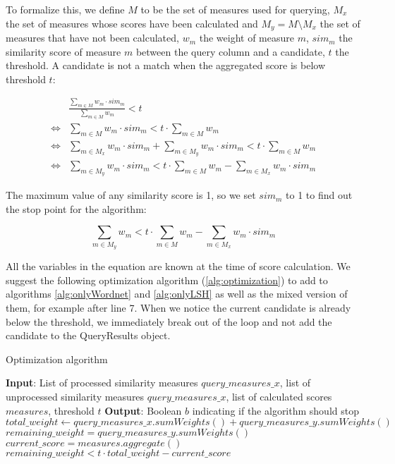 To formalize this, we define $M$ to be the set of measures used for querying, $M_x$ the set of measures whose scores have been calculated and $M_y = M \setminus M_x$ the set of measures that have not been calculated, $w_m$ the weight of measure $m$, $sim_m$ the similarity score of measure $m$ between the query column and a candidate, $t$ the threshold. A candidate is not a match when the aggregated score is below threshold $t$:

\begin{align*}
   & \frac{\sum_{m \in M} w_m \cdot sim_m}{\sum_{m \in M} w_m} < t \\
   \iff & \sum_{m \in M} w_m \cdot sim_m < t \cdot \sum_{m \in M} w_m \\
   \iff & \sum_{m \in M_x} w_m \cdot sim_m + \sum_{m \in M_y} w_m \cdot sim_m < t \cdot \sum_{m \in M} w_m \\
   \iff & \sum_{m \in M_y} w_m \cdot sim_m < t \cdot \sum_{m \in M} w_m - \sum_{m \in M_x} w_m \cdot sim_m
\end{align*}

The maximum value of any similarity score is 1, so we set $sim_m$ to 1 to find out the stop point for the algorithm:

\[\sum_{m \in M_y} w_m < t \cdot \sum_{m \in M} w_m - \sum_{m \in M_x} w_m \cdot sim_m\]

All the variables in the equation are known at the time of score calculation. We suggest the following optimization algorithm (\ref{alg:optimization}) to add to algorithms \ref{alg:onlyWordnet} and \ref{alg:onlyLSH} as well as the mixed version of them, for example after line 7. When we notice the current candidate is already below the threshold, we immediately break out of the loop and not add the candidate to the QueryResults object. 

\begin{algorithm}
    \caption{Optimization algorithm}
    \label{alg:optimization}
    \begin{algorithmic}[1]
\STATE \textbf{Input}: List of processed similarity measures $query\_measures\_x$, list of unprocessed similarity measures $query\_measures\_x$, list of calculated scores $measures$, threshold $t$
\STATE \textbf{Output}: Boolean $b$ indicating if the algorithm should stop
\STATE $total\_weight \gets query\_measures\_x.sumWeights() + query\_measures\_y.sumWeights()$
\STATE $remaining\_weight = query\_measures\_y.sumWeights()$
\STATE $current\_score = measures.aggregate()$
\RETURN $remaining\_weight < t \cdot total\_weight - current\_score$
    \end{algorithmic}
\end{algorithm}
